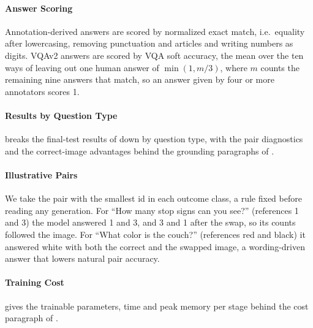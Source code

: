 \documentclass{article}
\newcommand{\apptable}[1]{\footnotesize\setlength{\tabcolsep}{3pt}}
\begin{document}
\paragraph{Answer Scoring}
Annotation-derived answers are scored by normalized exact match, i.e.\ equality after lowercasing, removing punctuation and articles and writing numbers as digits. VQAv2 answers are scored by VQA soft accuracy, the mean over the ten ways of leaving out one human answer of $\min(1,m/3)$, where $m$ counts the remaining nine answers that match, so an answer given by four or more annotators scores 1.

\paragraph{Results by Question Type}
 breaks the final-test results of  down by question type, with the pair diagnostics and the correct-image advantages behind the grounding paragraphs of .

\begin{table}[H]
  \centering
  \caption{Final-test results by question type and image condition, with 95\% pair-bootstrap intervals for the correct-image advantages over the complementary swap. Counting and open-ended (other) questions had the lowest accuracy.}
  \label{tab:t2full}
  \apptable{tables/t2_final_grounding.tex}\par\medskip
  \apptable{tables/t2_final_vqa.tex}
\end{table}

\paragraph{Illustrative Pairs}
\label{app:t2pairs}
We take the pair with the smallest id in each outcome class, a rule fixed before reading any generation. For ``How many stop signs can you see?'' (references 1 and 3) the model answered 1 and 3, and 3 and 1 after the swap, so its counts followed the image. For ``What color is the couch?'' (references red and black) it answered white with both the correct and the swapped image, a wording-driven answer that lowers natural pair accuracy.
\paragraph{Training Cost}
 gives the trainable parameters, time and peak memory per stage behind the cost paragraph of .
\end{document}
